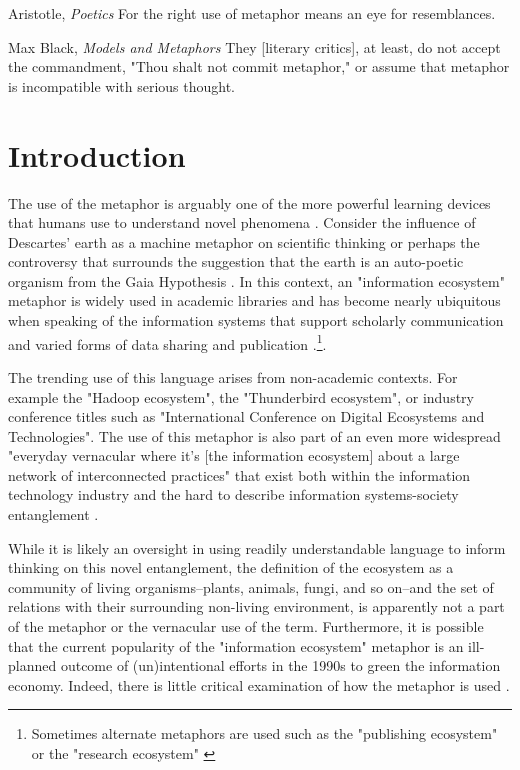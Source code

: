 \clearpage

\begin{epigraph}{Aristotle, \textit{Poetics}}
For the right use of metaphor means an eye for resemblances.
\end{epigraph}
\begin{epigraph}{Max Black, \textit{Models and Metaphors}}
They [literary critics], at least, do not accept the commandment, "Thou shalt not commit metaphor," or assume that metaphor is incompatible with serious thought.
\end{epigraph}

\section{Introduction}

The use of the metaphor is arguably one of the more powerful learning devices that humans use to understand novel phenomena \citep{livingstone_1981,anderson_2016}. Consider the influence of Descartes' earth as a machine metaphor on scientific thinking \citep{abram_1991} or perhaps the controversy that surrounds the suggestion that the earth is an auto-poetic organism from the Gaia Hypothesis \citep{lovelock_1974}. In this context, an "information ecosystem" metaphor is widely used in academic libraries and has become nearly ubiquitous when speaking of the information systems that support scholarly communication and varied forms of data sharing and publication \citep[for example see][]{walter_2008}.\footnote{Sometimes alternate metaphors are used such as the "publishing ecosystem" or the "research ecosystem" \citep[for respective examples see][]{esposito_2013,dylla_2016}}. 

The trending use of this language arises from non-academic contexts. For example the "Hadoop ecosystem", the "Thunderbird ecosystem", or industry conference titles such as "International Conference on Digital Ecosystems and Technologies". The use of this metaphor is also part of an even more widespread "everyday vernacular where it’s [the information ecosystem] about a large network of interconnected practices" that exist both within the information technology industry and the hard to describe information systems-society entanglement \citep{boyd_2016}. 

While it is likely an oversight in using readily understandable language to inform thinking on this novel entanglement, the definition of the ecosystem as a community of living organisms--plants, animals, fungi, and so on--and the set of relations with their surrounding non-living environment, is apparently not a part of the metaphor or the vernacular use of the term. Furthermore, it is possible that the current popularity of the "information ecosystem" metaphor is an ill-planned outcome of (un)intentional efforts in the 1990s to green the information economy. Indeed, there is little critical examination of how the metaphor is used \citep[although see][]{stepp_1999, nowviskie_2014}.

